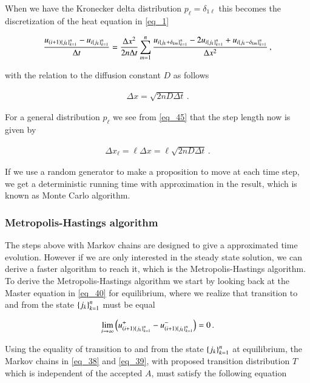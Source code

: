 \documentclass[11pt,english,a4paper]{article}
\begin{document}
\begin{flushleft}
When we have the Kronecker delta distribution $p_\ell = \delta_{1\ell}$ this becomes the discretization of the heat equation in \eqref{eq_1} 

\begin{align*}
\frac{u_{(i+1)\left\lbrace{j_k}\right\rbrace_{k=1}^n}-u_{i\left\lbrace{j_k}\right\rbrace_{k=1}^n}}{\Delta t} = \frac{\Delta x^2}{2n\Delta t}\sum_{m=1}^n\frac{u_{i\left\lbrace{j_k+\delta_{km}}\right\rbrace_{k=1}^n} - 2 u_{i\left\lbrace{j_k}\right\rbrace_{k=1}^n} + u_{i\left\lbrace{j_k-\delta_{km}}\right\rbrace_{k=1}^n}}{\Delta x^2} \,,
\end{align*}

with the relation to the diffusion constant $D$ as follows

\begin{align}
\Delta x = \sqrt{2nD\Delta t}\,. 
\label{eq_46}
\end{align}

For a general distribution $p_\ell$ we see from \eqref{eq_45} that the step length now is given by

\begin{align}
\Delta x_\ell = \ell \Delta x = \ell\sqrt{2nD\Delta t}\,.
\label{eq_47}
\end{align} 

If we use a random generator to make a proposition to move at each time step, we get a deterministic running time with approximation in the result, which is known as Monte Carlo algorithm. 

\subsubsection{Metropolis-Hastings algorithm}

The steps above with Markov chains are designed to give a approximated time evolution. However if we are only interested in the steady state solution, we can derive a faster algorithm to reach it, which is the Metropolis-Hastings algorithm. To derive the Metropolis-Hastings algorithm we start by looking back at the Master equation in \eqref{eq_40} for equilibrium, where we realize that transition to and from the state $\left\lbrace{j_k}\right\rbrace_{k=1}^n$ must be equal

\begin{align*}
\lim_{i\to \infty} \left({u_{(i+1)\left\lbrace{j_k}\right\rbrace_{k=1}^n}^+ - u_{(i+1)\left\lbrace{j_k}\right\rbrace_{k=1}^n}^-}\right) = 0 \,.
\end{align*}

Using the equality of transition to and from the state $\left\lbrace{j_k}\right\rbrace_{k=1}^n$ at equilibrium,  the Markov chains in \eqref{eq_38} and \eqref{eq_39}, with proposed transition distribution $T$ which is independent of the accepted $A$, must satisfy the following equation


\end{flushleft}
\end{document}
